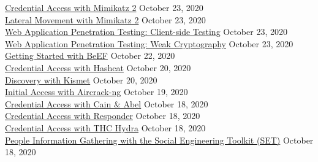 \documentclass[10pt]{res} %
\begin{document}
\begin{resume}
\href{https://bjdelacruz.dev/files/certificates/pluralsight/34_Credential_Access_with_Mimikatz_2.pdf}{\color{blue}Credential Access with Mimikatz 2} \hfill October 23, 2020 \\
\href{https://bjdelacruz.dev/files/certificates/pluralsight/45_Lateral_Movement_with_Mimikatz_2.pdf}{\color{blue}Lateral Movement with Mimikatz 2} \hfill October 23, 2020 \\
\href{https://bjdelacruz.dev/files/certificates/pluralsight/8_Web_Application_Penetration_Testing_Client_side_Testing.pdf}{\color{blue}Web Application Penetration Testing: Client-side Testing} \hfill October 23, 2020 \\
\href{https://bjdelacruz.dev/files/certificates/pluralsight/7_Web_Application_Penetration_Testing_Weak_Cryptography.pdf}{\color{blue}Web Application Penetration Testing: Weak Cryptography} \hfill October 23, 2020 \\
\href{https://bjdelacruz.dev/files/certificates/pluralsight/Getting_Started_with_BeEF.pdf}{\color{blue}Getting Started with BeEF} \hfill October 22, 2020 \\
\href{https://bjdelacruz.dev/files/certificates/pluralsight/35_Credential_Access_with_Hashcat.pdf}{\color{blue}Credential Access with Hashcat} \hfill October 20, 2020 \\
\href{https://bjdelacruz.dev/files/certificates/pluralsight/43_Discovery_with_Kismet.pdf}{\color{blue}Discovery with Kismet} \hfill October 20, 2020 \\
\href{https://bjdelacruz.dev/files/certificates/pluralsight/13_Initial_Access_with_Aircrack_ng.pdf}{\color{blue}Initial Access with Aircrack-ng} \hfill October 19, 2020 \\
\href{https://bjdelacruz.dev/files/certificates/pluralsight/37_Credential_Access_with_Cain_Abel.pdf}{\color{blue}Credential Access with Cain \& Abel} \hfill October 18, 2020 \\
\href{https://bjdelacruz.dev/files/certificates/pluralsight/36_Credential_Access_with_Responder.pdf}{\color{blue}Credential Access with Responder} \hfill October 18, 2020 \\
\href{https://bjdelacruz.dev/files/certificates/pluralsight/39_Credential_Access_with_THC_Hydra.pdf}{\color{blue}Credential Access with THC Hydra} \hfill October 18, 2020 \\
\href{https://bjdelacruz.dev/files/certificates/pluralsight/7_People_Information_Gathering_with_the_Social_Engineering_Toolkit_SET.pdf}{\color{blue}People Information Gathering with the Social Engineering Toolkit (SET)} \hfill October 18, 2020 \\

\end{resume}
\end{document}
